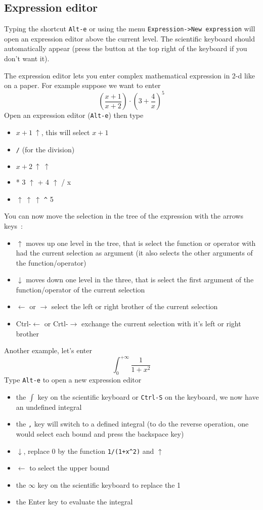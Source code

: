 \documentclass{article}
\begin{document}
\subsection{Expression editor} \label{sec:eqw}
Typing the shortcut {\tt Alt-e} 
or using the menu {\tt Expression->New expression} will
open an expression editor above the current level. The scientific
keyboard should automatically appear (press the  button at the 
top right of the keyboard if you don't want it).

The expression editor lets you enter complex mathematical expression
in 2-d like on a paper. 
For example suppose we want to enter
\[ \left(\frac{x+1}{x+2}\right) \cdot \left(3+\frac{4}{x} \right)^5 \]
Open an expression editor ({\tt Alt-e}) then type
\begin{itemize}
\item $x+1 \ \uparrow$, this will select $x+1$
\item \verb|/| (for the division)
\item $x+2 \ \uparrow \ \uparrow$
\item
* 3 $\uparrow$ + 4 $\uparrow$ / x
\item
$\uparrow \ \uparrow \ \uparrow$ \verb|^| 5
\end{itemize}
You can now move the selection in the tree of the expression
with the arrows keys~:
\begin{itemize}
\item $\uparrow$ moves up one level in the tree, that is select the
function or operator with had the current selection as argument 
(it also selects the other arguments of the function/operator)
\item $\downarrow$ moves down one level in the three, that is select
the first argument of the function/operator of the current selection
\item $\leftarrow$ or $\rightarrow$ select the left or right brother 
of the current selection
\item Ctrl-$\leftarrow$ or Crtl-$\rightarrow$ exchange the current selection
with it's left or right brother
\end{itemize}

Another example, let's enter
\[ \int_0^{+\infty} \frac{1}{1+x^2} \]
Type {\tt Alt-e} to open a new expression editor
\begin{itemize}
\item the $\int$ key on the scientific keyboard or {\tt Ctrl-S} on
the keyboard, we now have an undefined integral
\item the \verb|,| key will switch to a defined integral (to do the
reverse operation, one would select each bound and press the backspace
key)
\item $\downarrow$, replace 0 by the function \verb|1/(1+x^2)|
and $\uparrow$
\item $\leftarrow$ to select the upper bound
\item the $\infty$ key on the scientific keyboard to replace the 1
\item the Enter key to evaluate the integral
\end{itemize}
\end{document}
